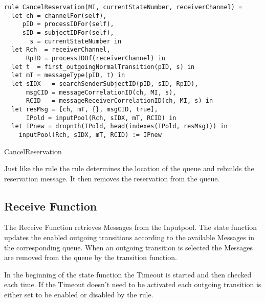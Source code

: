 \begin{listing}[H]
\begin{verbatim}
rule CancelReservation(MI, currentStateNumber, receiverChannel) =
  let ch = channelFor(self),
     pID = processIDFor(self),
     sID = subjectIDFor(self),
       s = currentStateNumber in
  let Rch  = receiverChannel,
      RpID = processIDOf(receiverChannel) in
  let t  = first_outgoingNormalTransition(pID, s) in
  let mT = messageType(pID, t) in
  let sIDX   = searchSenderSubjectID(pID, sID, RpID),
      msgCID = messageCorrelationID(ch, MI, s),
      RCID   = messageReceiverCorrelationID(ch, MI, s) in
  let resMsg = [ch, mT, {}, msgCID, true],
      IPold = inputPool(Rch, sIDX, mT, RCID) in
  let IPnew = dropnth(IPold, head(indexes(IPold, resMsg))) in
    inputPool(Rch, sIDX, mT, RCID) := IPnew
\end{verbatim}
\caption{CancelReservation}
\label{lst:shortasm:CancelReservation}
\end{listing}


Just like the  rule the
 rule determines the location of the queue and
rebuilds the reservation message. It then removes the reservation from the
queue.


\subsection{Receive Function}


The Receive Function retrieves Messages from the Inputpool. The state function
updates the enabled outgoing transitions according to the available Messages in
the corresponding queue. When an outgoing transition is selected the Messages
are removed from the queue by the transition function.


In the beginning of the state function the Timeout is started and then checked
each time.
If the Timeout doesn't need to be activated each outgoing transition is either set to
be enabled or disabled by the  rule.


